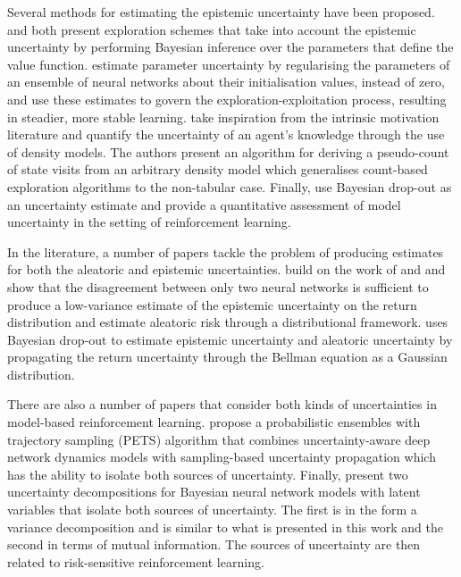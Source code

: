 Several methods for estimating the epistemic uncertainty have been proposed. \citet{azizzadenesheli2018efficient} and \citet{lipton2018bbq} both present exploration schemes that take into account the epistemic uncertainty by performing Bayesian inference over the parameters that define the value function. \citet{pearce2018bayesian}   estimate parameter uncertainty by regularising the parameters of an ensemble of neural networks about their initialisation values, instead of zero,  and use these estimates to govern the exploration-exploitation process, resulting in steadier, more stable learning. \citet{bellemare2016unifying} take inspiration from the intrinsic motivation literature and quantify the uncertainty of an agent's knowledge through the use of density models. The authors present an algorithm for deriving a pseudo-count of state visits from an arbitrary density model which generalises count-based exploration algorithms to the non-tabular case. Finally, \citet{gal2016dropout} use Bayesian drop-out as an uncertainty estimate and provide a quantitative assessment of model uncertainty in the setting of reinforcement learning.

In the literature, a number of papers tackle the problem of producing estimates for both the aleatoric and epistemic uncertainties. \citet{clements2019estimating} build on the work of \cite{gal2016dropout} and \citet{pearce2018bayesian} and show that the disagreement between only two neural networks is sufficient to produce a low-variance estimate of the epistemic uncertainty on the return distribution and estimate aleatoric risk through a distributional framework. \citet{moerland2017efficient} uses Bayesian drop-out to estimate epistemic uncertainty and aleatoric uncertainty by propagating the return uncertainty through the Bellman equation as a Gaussian distribution. 

There are also a number of papers that consider both kinds of uncertainties in model-based reinforcement learning. \citet{chua2018deep} propose a  probabilistic ensembles with trajectory sampling (PETS) algorithm that combines uncertainty-aware deep network dynamics models with sampling-based uncertainty propagation which has the ability to isolate both sources of uncertainty. Finally, \cite{depeweg2017decomposition} present two uncertainty decompositions for Bayesian neural network models with latent variables that isolate both sources of uncertainty. The first is in the form a variance decomposition and is similar to what is presented in this work and the second in terms of mutual information. The sources of uncertainty are then related to risk-sensitive reinforcement learning.